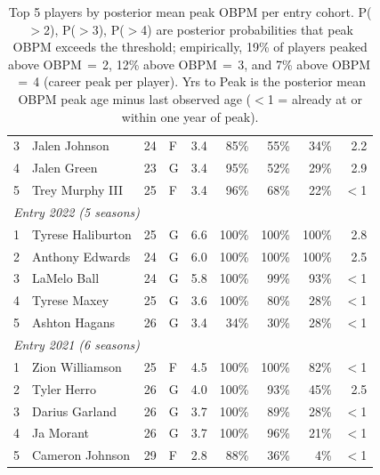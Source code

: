 \begin{table}[htbp]
\begin{tabular}{rlrlrrrrr}
    3 & Jalen Johnson & 24 & F & 3.4 & 85\% & 55\% & 34\% & 2.2 \\
    4 & Jalen Green & 23 & G & 3.4 & 95\% & 52\% & 29\% & 2.9 \\
    5 & Trey Murphy III & 25 & F & 3.4 & 96\% & 68\% & 22\% & $<$1 \\
    \midrule[0.4pt]
    \multicolumn{9}{l}{\textit{Entry 2022 (5 seasons)}} \\
    \midrule
    1 & Tyrese Haliburton & 25 & G & 6.6 & 100\% & 100\% & 100\% & 2.8 \\
    2 & Anthony Edwards & 24 & G & 6.0 & 100\% & 100\% & 100\% & 2.5 \\
    3 & LaMelo Ball & 24 & G & 5.8 & 100\% & 99\% & 93\% & $<$1 \\
    4 & Tyrese Maxey & 25 & G & 3.6 & 100\% & 80\% & 28\% & $<$1 \\
    5 & Ashton Hagans & 26 & G & 3.4 & 34\% & 30\% & 28\% & $<$1 \\
    \midrule[0.4pt]
    \multicolumn{9}{l}{\textit{Entry 2021 (6 seasons)}} \\
    \midrule
    1 & Zion Williamson & 25 & F & 4.5 & 100\% & 100\% & 82\% & $<$1 \\
    2 & Tyler Herro & 26 & G & 4.0 & 100\% & 93\% & 45\% & 2.5 \\
    3 & Darius Garland & 26 & G & 3.7 & 100\% & 89\% & 28\% & $<$1 \\
    4 & Ja Morant & 26 & G & 3.7 & 100\% & 96\% & 21\% & $<$1 \\
    5 & Cameron Johnson & 29 & F & 2.8 & 88\% & 36\% & 4\% & $<$1 \\
    \bottomrule
  \end{tabular}
  \caption{Top 5 players by posterior mean peak OBPM per entry cohort. P($>$2), P($>$3), P($>$4) are posterior probabilities that peak OBPM exceeds the threshold; empirically, 19\% of players peaked above OBPM\,$=$\,2, 12\% above OBPM\,$=$\,3, and 7\% above OBPM\,$=$\,4 (career peak per player). Yrs to Peak is the posterior mean OBPM peak age minus last observed age ($<$1 = already at or within one year of peak).}
  \label{tab:breakout_cohort}
\end{table}

